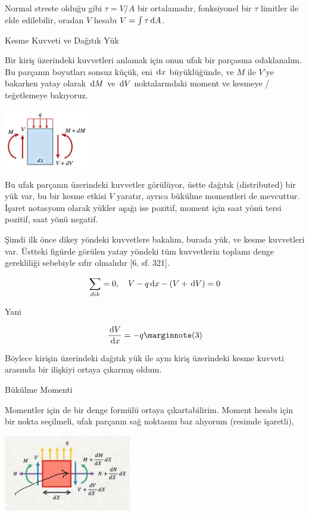 \documentclass[12pt,fleqn]{article}\usepackage{../../common}
\begin{document}
Normal streste olduğu gibi $\tau = V / A$ bir ortalamadır, fonksiyonel bir
$\tau$ limitler ile elde edilebilir, oradan $V$ hesabı $V = \int \tau \,\mathrm{d} A$. 



Kesme Kuvveti ve Dağıtık Yük

Bir kiriş üzerindeki kuvvetleri anlamak için onun ufak bir parçasına
odaklanalım. Bu parçanın boyutları sonsuz küçük, eni $\,\mathrm{d} x$ büyüklüğünde, ve
$M$ ile $V$'ye bakarken yatay olarak $\,\mathrm{d} M$ ve $\,\mathrm{d} V$ noktalarındaki moment ve
kesmeye / teğetlemeye bakıyoruz.

\includegraphics[width=10em]{phy_020_strs_02_10.jpg}

Bu ufak parçanın üzerindeki kuvvetler görülüyor, üstte dağıtık (distributed) bir
yük var, bu bir kesme etkisi $V$ yaratır, ayrıca bükülme momentleri de
mevcuttur. İşaret notasyonu olarak yükler aşağı ise pozitif, moment için
saat yönü tersi pozitif, saat yönü negatif.

Şimdi ilk önce dikey yöndeki kuvvetlere bakalım, burada yük, ve kesme
kuvvetleri var. Üstteki figürde görülen yatay yöndeki tüm kuvvetlerin toplamı
denge gerekliliği sebebiyle sıfır olmalıdır [6, sf. 321].

$$
\sum_{dik} = 0, \quad V - q \,\mathrm{d} x - (V + \,\mathrm{d} V) = 0
$$

Yani

$$
\frac{\ud V}{\ud x} = -q
\mlabel{3}
$$

Böylece kirişin üzerindeki dağıtık yük ile aynı kiriş üzerindeki kesme
kuvveti arasında bir ilişkiyi ortaya çıkarmış oldum. 

Bükülme Momenti

Momentler için de bir denge formülü ortaya çıkartabilirim. Moment hesabı için
bir nokta seçilmeli, ufak parçanın sağ noktasını baz alıyorum (resimde
işaretli),

\includegraphics[width=15em]{phy_020_strs_02_11.jpg}
\end{document}
